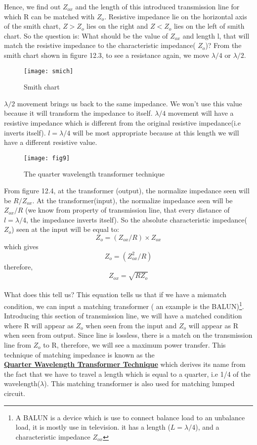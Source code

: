  Hence, we find out $ Z_{ox}$ and the length of this introduced transmission line for which R can be matched with $ Z_o$. Resistive impedance lie on the horizontal axis of the smith chart, $Z >  Z_o$ lies on the right and $Z <  Z_o$ lies on the left of smith chart.
 So the question is: What should be the value of $Z_{ox}$ and length l, that will match the resistive impedance to the characteristic impedance( $Z_o$)? From the smith chart shown in figure 12.3, to see a resistance again, we move $ \lambda/4$  or $ \lambda/2$. %
 \begin{figure}[h]
 	\centering
 	\texttt{[image: smich]}
 	\caption{Smith chart}
 \end{figure}
     $\lambda/2$ movement brings us back to the same impedance. We won't use this value because it will transform the impedance to itself. $\lambda/4$ movement will have a resistive impedance which is different from the original resistive impedance(i.e inverts itself). $l = \lambda/4 $ will be most appropriate because at this length we will have a different resistive value.\\%
 \begin{figure}[h]
 	\centering
 	\texttt{[image: fig9]}
 	\caption{The quarter wavelength transformer technique}
 \end{figure}
From figure 12.4, at the transformer (output), the normalize impedance seen will be $R/Z_{ox}$. At the transformer(input), the normalize impedance seen will be $Z_{ox}/R$ (we know from property of transmission line, that every distance of $l = \lambda/4$, the impedance inverts itself). So the absolute characteristic impedance($ Z_o$) seen at the input will be equal to: 
\[
 Z_o=(Z_{ox}/R)\times Z_{ox}\]  which gives 
 \[ Z_o=(Z_{ox}^2/R)\]
 therefore, \begin{equation}
 Z_{ox}=\sqrt{RZ_o}
 \end{equation}\\
 
 What does this tell us? This equation tells us that if we have a mismatch condition, we can input a matching transformer ( an example is the BALUN)\footnote{A BALUN is a device which is use to connect balance load to an unbalance load, it is mostly use in television.  it has a length ($L=\lambda/4$), and a characteristic impedance $Z_{ox} $}.
 	Introducing this section of transmission line, we will have a matched condition where R will appear as $ Z_o$ when seen from the input and $ Z_o$ will appear as R when seen from output. Since line is lossless, there is a match on the transmission line from $ Z_o$ to R, therefore, we will see a maximum power transfer.
 	This technique of matching impedance is known as the\\ 
 	\underline{\textbf{Quarter Wavelength Transformer Technique}} which derives its name from the fact that we have to travel a length which is equal to a quarter, i.e 1/4 of the wavelength($\lambda$). This matching transformer is also used for matching lumped circuit.\\
